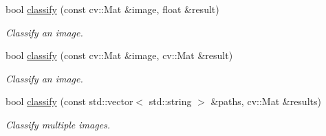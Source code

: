 \begin{DoxyCompactItemize}
bool \hyperlink{classLegoVision_aa8ca2dcfc88262604a0afca920fcccf8}{classify} (const cv::Mat \&image, float \&result)
\begin{DoxyCompactList}\small\item\em Classify an image. \item\end{DoxyCompactList}\item 
bool \hyperlink{classLegoVision_a57197915f439503ba602ef0ad0e03e66}{classify} (const cv::Mat \&image, cv::Mat \&result)
\begin{DoxyCompactList}\small\item\em Classify an image. \item\end{DoxyCompactList}\item 
bool \hyperlink{classLegoVision_aab8d7ac39a37e2e8f901ca774793854b}{classify} (const std::vector$<$ std::string $>$ \&paths, cv::Mat \&results)
\begin{DoxyCompactList}\small\item\em Classify multiple images. \item\end{DoxyCompactList}\end{DoxyCompactItemize}
